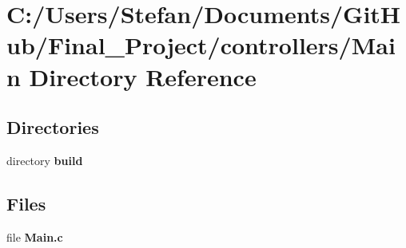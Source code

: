 \section{C\-:/\-Users/\-Stefan/\-Documents/\-Git\-Hub/\-Final\-\_\-\-Project/controllers/\-Main Directory Reference}
\label{dir_24052cf6ef07adb18ec9f3233be45581}
\subsection*{Directories}
\begin{DoxyCompactItemize}
\item 
directory {\bf build}
\end{DoxyCompactItemize}
\subsection*{Files}
\begin{DoxyCompactItemize}
\item 
file {\bf Main.\-c}
\end{DoxyCompactItemize}
